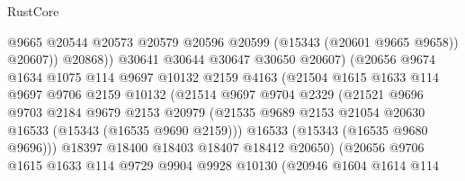 \begin{lexlean}{RustCore}
\begin{coremodule}
                                  @9665
                                  @20544
                                  @20573
                                  @20579
                                  @20596
                                  @20599
                                  (@15343 (@20601 @9665 @9658))
                                  @20607))
                              @20868))
                          @30641
                          @30644
                          @30647
                          @30650
                          @20607)
                        (@20656
                          @9674
                          @1634
                          @1075
                          @114
                          @9697
                          @10132
                          @2159
                          @4163
                          (@21504
                            @1615
                            @1633
                            @114
                            @9697
                            @9706
                            @2159
                            @10132
                            (@21514
                              @9697
                              @9704
                              @2329
                              (@21521
                                @9696
                                @9703
                                @2184
                                @9679
                                @2153
                                @20979
                                (@21535
                                  @9689
                                  @2153
                                  @21054
                                  @20630
                                  @16533
                                  (@15343 (@16535 @9690 @2159)))
                                @16533
                                (@15343 (@16535 @9680 @9696)))
                              @18397
                              @18400
                              @18403
                              @18407
                              @18412
                              @20650)
                            (@20656
                              @9706
                              @1615
                              @1633
                              @114
                              @9729
                              @9904
                              @9928
                              @10130
                              (@20946
                                @1604
                                @1614
                                @114

\end{coremodule}
\end{lexlean}
